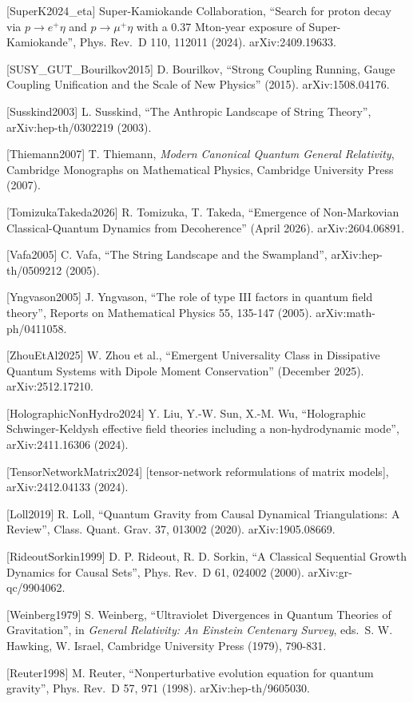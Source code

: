 \documentclass[
]{article}
\begin{document}
{[}SuperK2024\_eta{]} Super-Kamiokande Collaboration, ``Search for
proton decay via \(p \to e^+\eta\) and \(p \to \mu^+\eta\) with a 0.37
Mton-year exposure of Super-Kamiokande'', Phys. Rev.~D 110, 112011
(2024). arXiv:2409.19633.

{[}SUSY\_GUT\_Bourilkov2015{]} D. Bourilkov, ``Strong Coupling Running,
Gauge Coupling Unification and the Scale of New Physics'' (2015).
arXiv:1508.04176.

{[}Susskind2003{]} L. Susskind, ``The Anthropic Landscape of String
Theory'', arXiv:hep-th/0302219 (2003).

{[}Thiemann2007{]} T. Thiemann, \emph{Modern Canonical Quantum General
Relativity}, Cambridge Monographs on Mathematical Physics, Cambridge
University Press (2007).

{[}TomizukaTakeda2026{]} R. Tomizuka, T. Takeda, ``Emergence of
Non-Markovian Classical-Quantum Dynamics from Decoherence'' (April
2026). arXiv:2604.06891.

{[}Vafa2005{]} C. Vafa, ``The String Landscape and the Swampland'',
arXiv:hep-th/0509212 (2005).

{[}Yngvason2005{]} J. Yngvason, ``The role of type III factors in
quantum field theory'', Reports on Mathematical Physics 55, 135-147
(2005). arXiv:math-ph/0411058.

{[}ZhouEtAl2025{]} W. Zhou et al., ``Emergent Universality Class in
Dissipative Quantum Systems with Dipole Moment Conservation'' (December
2025). arXiv:2512.17210.

{[}HolographicNonHydro2024{]} Y. Liu, Y.-W. Sun, X.-M. Wu, ``Holographic
Schwinger-Keldysh effective field theories including a non-hydrodynamic
mode'', arXiv:2411.16306 (2024).

{[}TensorNetworkMatrix2024{]} {[}tensor-network reformulations of matrix
models{]}, arXiv:2412.04133 (2024).

{[}Loll2019{]} R. Loll, ``Quantum Gravity from Causal Dynamical
Triangulations: A Review'', Class. Quant. Grav. 37, 013002 (2020).
arXiv:1905.08669.

{[}RideoutSorkin1999{]} D. P. Rideout, R. D. Sorkin, ``A Classical
Sequential Growth Dynamics for Causal Sets'', Phys. Rev.~D 61, 024002
(2000). arXiv:gr-qc/9904062.

{[}Weinberg1979{]} S. Weinberg, ``Ultraviolet Divergences in Quantum
Theories of Gravitation'', in \emph{General Relativity: An Einstein
Centenary Survey}, eds.~S. W. Hawking, W. Israel, Cambridge University
Press (1979), 790-831.

{[}Reuter1998{]} M. Reuter, ``Nonperturbative evolution equation for
quantum gravity'', Phys. Rev.~D 57, 971 (1998). arXiv:hep-th/9605030.
\end{document}
